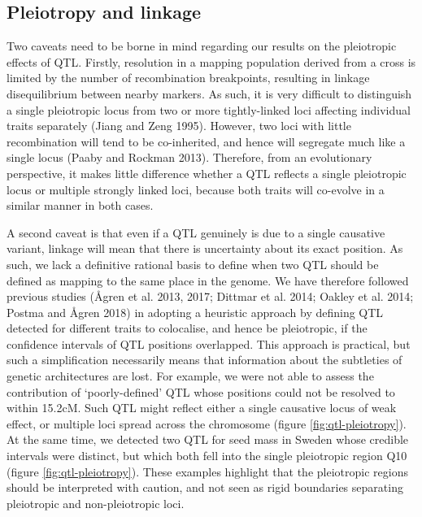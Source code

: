 \documentclass[]{article}
\begin{document}
\hypertarget{pleiotropy-and-linkage}{%
\subsection{Pleiotropy and linkage}\label{pleiotropy-and-linkage}}

Two caveats need to be borne in mind regarding our results on the pleiotropic effects of QTL.
Firstly, resolution in a mapping population derived from a cross is limited by the number of recombination breakpoints, resulting in linkage disequilibrium between nearby markers.
As such, it is very difficult to distinguish a single pleiotropic locus from two or more tightly-linked loci affecting individual traits separately (Jiang and Zeng 1995).
However, two loci with little recombination will tend to be co-inherited, and hence will segregate much like a single locus (Paaby and Rockman 2013).
Therefore, from an evolutionary perspective, it makes little difference whether a QTL reflects a single pleiotropic locus or multiple strongly linked loci, because both traits will co-evolve in a similar manner in both cases.

A second caveat is that even if a QTL genuinely is due to a single causative variant, linkage will mean that there is uncertainty about its exact position.
As such, we lack a definitive rational basis to define when two QTL should be defined as mapping to the same place in the genome.
We have therefore followed previous studies (Ågren et al. 2013, 2017; Dittmar et al. 2014; Oakley et al. 2014; Postma and Ågren 2018) in adopting a heuristic approach by defining QTL detected for different traits to colocalise, and hence be pleiotropic, if the confidence intervals of QTL positions overlapped.
This approach is practical, but such a simplification necessarily means that information about the subtleties of genetic architectures are lost.
For example, we were not able to assess the contribution of `poorly-defined' QTL whose positions could not be resolved to within 15.2cM.
Such QTL might reflect either a single causative locus of weak effect, or multiple loci spread across the chromosome (figure \ref{fig:qtl-pleiotropy}).
At the same time, we detected two QTL for seed mass in Sweden whose credible intervals were distinct, but which both fell into the single pleiotropic region Q10 (figure \ref{fig:qtl-pleiotropy}).
These examples highlight that the pleiotropic regions should be interpreted with caution, and not seen as rigid boundaries separating pleiotropic and non-pleiotropic loci.
\end{document}
